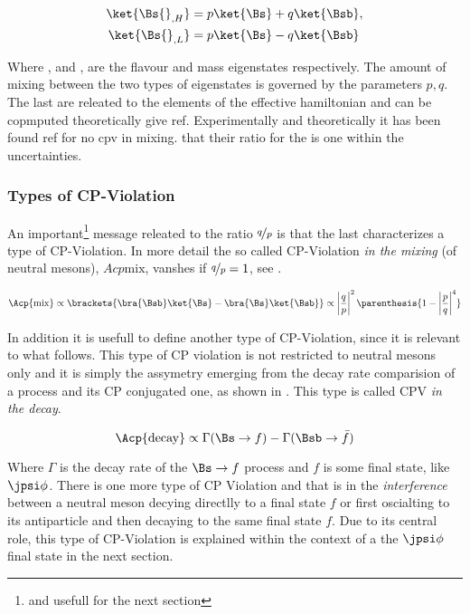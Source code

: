 \begin{align}
\ket{\Bs{}_{,H}} &= p \ket{\Bs} + q \ket{\Bsb}, \nonumber \\
\ket{\Bs{}_{,L}} &= p \ket{\Bs} - q \ket{\Bsb}
\label{bs_mass_eigen}
\end{align}

\noindent Where \ket{\Bs}, \ket{\Bsb} and ,  are the flavour and mass
eigenstates respectively. The amount of mixing between the two types of eigenstates is governed by
the parameters $p,q$. The last are releated to the elements of the effective hamiltonian and can be
copmputed theoretically{\color{red} give ref}. Experimentally and theoretically it has been found{\color{red} ref for no cpv in mixing.}
that their ratio for the \BBbarSyst is one within the uncertainties.

\subsubsection{Types of CP-Violation}
An important\footnote{and usefull for the next section} message releated to the ratio $\nicefrac{q}{p}$ is that
the last characterizes a type of CP-Violation. In more detail the so called CP-Violation {\it in the mixing} (of neutral mesons),
$Acp{\text{mix}}$, vanshes if $\nicefrac{q}{p} = 1$, see .

\begin{equation}
\Acp{\text{mix}} \propto \brackets{\bra{\Bsb}\ket{\Bs} - \bra{\Bs}\ket{\Bsb}} \propto \left|\frac{q}{p}\right|^2 \parenthesis{ 1 - \left|\frac{p}{q}\right|^4}
\label{cpv_mixing}
\end{equation}

\noindent In addition it is usefull to define another type of CP-Violation, since it is relevant to what follows.
This type of CP violation is not restricted to neutral mesons only and it is simply the assymetry emerging from
the decay rate comparision of a process and its CP conjugated one, as shown in . This type is
called CPV {\it in the decay}.

\begin{equation}
\Acp{\text{decay}} \propto \Gamma(\Bs \rightarrow f) - \Gamma(\Bsb \rightarrow \bar{f})
\label{cpv_decay}
\end{equation}

\noindent Where $\Gamma$ is the decay rate of the $\Bs \rightarrow f$ process and $f$ is some final state,
like $\jpsi\phi$. There is one more type of CP Violation and that is in the {\it interference} between
a neutral meson decying directlly to a final state $f$ or first oscialting to its antiparticle and then decaying
to the same final state $f$. Due to its central role, this type of CP-Violation is explained within
the context of a the $\jpsi\phi$ final state in the next section.
